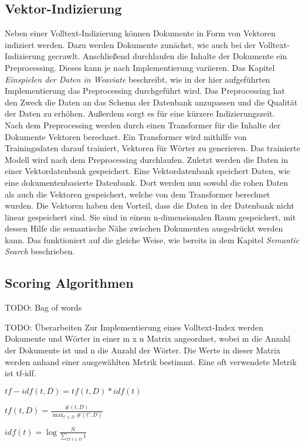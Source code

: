 \subsection{Vektor-Indizierung}
Neben einer Volltext-Indizierung können Dokumente in Form von Vektoren indiziert werden.
Dazu werden Dokumente zunächst, wie auch bei der Volltext-Indizierung gecrawlt.
Anschließend durchlaufen die Inhalte der Dokumente ein Preprocessing.
Dieses kann je nach Implementierung variieren.
Das Kapitel \textit{Einspielen der Daten in Weaviate} beschreibt, wie in der hier aufgeführten Implementierung das Preprocessing durchgeführt wird.
Das Preprocessing hat den Zweck die Daten an das Schema der Datenbank anzupassen und die Qualität der Daten zu erhöhen.
Außerdem sorgt es für eine kürzere Indizierungszeit.\\

Nach dem Preprocessing werden durch einen Transformer für die Inhalte der Dokumente Vektoren berechnet.
Ein Transformer wird mithilfe von Trainingsdaten darauf trainiert, Vektoren für Wörter zu generieren.
Das trainierte Modell wird nach dem Preprocessing durchlaufen.
Zuletzt werden die Daten in einer Vektordatenbank gespeichert.
Eine Vektordatenbank speichert Daten, wie eine dokumentenbasierte Datenbank.
Dort werden nun sowohl die rohen Daten als auch die Vektoren gespeichert, welche von dem Transformer berechnet wurden.
Die Vektoren haben den Vorteil, dass die Daten in der Datenbank nicht linear gespeichert sind.
Sie sind in einem n-dimensionalen Raum gespeichert, mit dessen Hilfe die semantische Nähe zwischen Dokumenten ausgedrückt werden kann.
Das funktioniert auf die gleiche Weise, wie bereits in dem Kapitel \textit{Semantic Search} beschrieben.

\subsection{Scoring Algorithmen}
TODO: Bag of words

TODO: Überarbeiten
Zur Implementierung eines Volltext-Index werden Dokumente und Wörter in einer m x n Matrix angeordnet, wobei m die Anzahl der Dokumente ist und n die Anzahl der Wörter.
Die Werte in dieser Matrix werden anhand einer ausgewählten Metrik bestimmt.
Eine oft verwendete Metrik ist tf-idf.

\(tf-idf(t,D)=tf(t,D)*idf(t)\)

\(tf(t,D)=\frac {\#(t,D)}{\max _{t'\in D}\#(t',D)}\)

\(idf(t)=\log {\frac {N}{\sum_{D:t\in D}1}}\)

